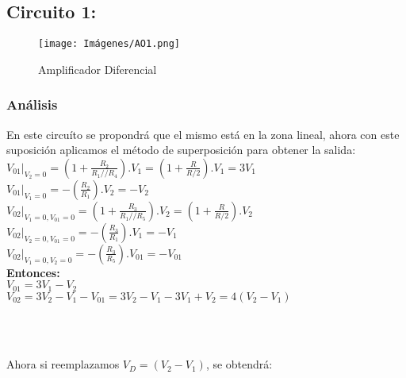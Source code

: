     \subsection{Circuito 1:}
    \begin{figure}[ht]
    	\centering
    	\texttt{[image: Imágenes/AO1.png]}
    	\caption{Amplificador Diferencial}
    \end{figure}
    
        \subsubsection{Análisis}
        En este circuíto se propondrá que el mismo está en la zona lineal, ahora con este suposición aplicamos el método de superposición para obtener la salida: \\
        
        $V_{01}|_{V_2=0} = (1+\frac{R_2}{R_1//R_4}).V_1 = (1+\frac{R}{R/2}).V_1 = 3V_1 $\\
        
        $V_{01}|_{V_1=0} = -(\frac{R_2}{R_1}).V_2 = -V_2 $\\
        
        $V_{02}|_{V_1=0, V_{01}=0} = (1+\frac{R_3}{R_1//R_5}).V_2 = (1+\frac{R}{R/2}).V_2 $\\
        
        $V_{02}|_{V_2=0, V_{01}=0} = -(\frac{R_3}{R_1}).V_1 = -V_1 $\\
        
        $V_{02}|_{V_1=0, V_2=0} = -(\frac{R_3}{R_5}).V_{01} = -V_{01} $\\
        
       \textbf{ Entonces:}\\
        
        $V_{01} =  3V_1 - V_2$\\
        
        $V_{02} =  3V_2 - V_1 -V_{01} = 3V_2 - V_1 -3V_1 + V_2 = 4(V_2-V_1) $\\

        \begin{center}
            \\
            \\
        \end{center}

        Ahora si reemplazamos $V_D = (V_2 - V_1)$, se obtendrá:\\
        
